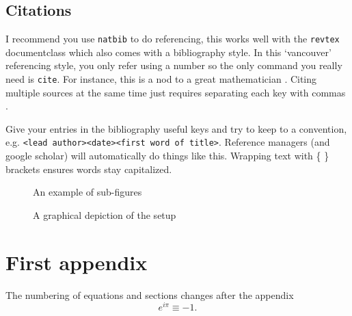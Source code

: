 \documentclass[
 reprint, %
 amsmath, amssymb, aps, %
 a4paper,
]{revtex4-2}
\begin{document}
\subsection{Citations}

I recommend you use \texttt{natbib} to do referencing, this works well with the \texttt{revtex} documentclass which also comes with a bibliography style. 
In this `vancouver' referencing style, you only refer using a number so the only command you really need is \texttt{cite}. For instance, this is a nod to a great mathematician \cite{turing1990chemical}. 
Citing multiple sources at the same time just requires separating each key with commas \cite{turing1990chemical,cooley1967fft}.

Give your entries in the bibliography useful keys and try to keep to a convention, e.g. \texttt{<lead author><date><first word of title>}.
Reference managers (and google scholar) will automatically do things like this. Wrapping text with \{ \} brackets ensures words stay capitalized.


\begin{figure} %
    \centering
    \hfill
    \caption{An example of sub-figures}
    \label{fig:doublefig}
\end{figure}

\begin{figure}
    \centering
    \hfil
    \caption{A graphical depiction of the setup}
    \label{fig:subfigureExample}
\end{figure}



\appendix

\section{First appendix}

The numbering of equations and sections changes after the appendix
\begin{equation}
    e^{i\pi}\equiv-1.
\end{equation}
\end{document}
